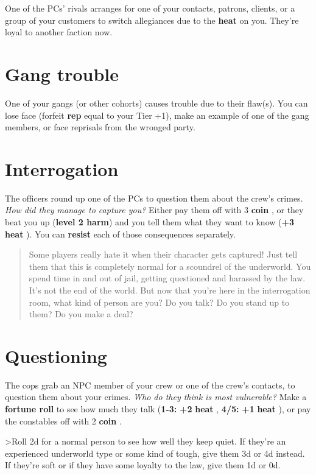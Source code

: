 \documentclass[11pt,oneside]{book}
\newcommand{\gameterm}[1]{\textbf{#1}}
\begin{document}
One of the PCs’ rivals arranges for one of your contacts, patrons, clients, or a group of your customers to switch allegiances due to the \gameterm{heat}  on you. They’re loyal to another faction now.

\section{Gang trouble}

One of your gangs (or other cohorts) causes trouble due to their flaw(s). You can lose face (forfeit\gameterm{ rep}  equal to your Tier +1), make an example of one of the gang members, or face reprisals from the wronged party.

\section{Interrogation}

The officers round up one of the PCs to question them about the crew’s crimes. \emph{How did they manage to capture you?} Either pay them off with 3 \gameterm{coin} , or they beat you up (\textbf{level 2 harm}) and you tell them what they want to know (\textbf{+3} \gameterm{heat} ). You can \textbf{resist} each of those consequences separately.

\begin{quote}
	Some players really hate it when their character gets captured! Just tell them that this is completely normal for a scoundrel of the underworld. You spend time in and out of jail, getting questioned and harassed by the law. It’s not the end of the world. But now that you’re here in the interrogation room, what kind of person are you? Do you talk? Do you stand up to them? Do you make a deal?
\end{quote} 

\section{Questioning}

The cops grab an NPC member of your crew or one of the crew’s contacts, to question them about your crimes. \emph{Who do they think is most vulnerable?} Make a \textbf{fortune roll} to see how much they talk (\gameterm{1-3:}  \textbf{+2} \gameterm{heat} , \gameterm{4/5:}  \textbf{+1} \gameterm{heat} ), or pay the constables off with 2 \gameterm{coin} .

>Roll 2d for a normal person to see how well they keep quiet. If they’re an experienced underworld type or some kind of tough, give them 3d or 4d instead. If they’re soft or if they have some loyalty to the law, give them 1d or 0d.
\end{document}
